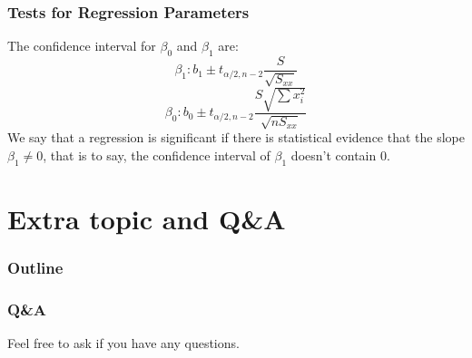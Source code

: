 \documentclass{beamer}
\begin{document}
\begin{frame}
    \frametitle{Tests for Regression Parameters}
    The confidence interval for $\beta_0$ and $\beta_1$ are:
    \[\beta_1: b_1\pm t_{\alpha/2, n-2} \frac{S}{\sqrt{S_{xx}}}\]
    \[\beta_0: b_0\pm t_{\alpha/2, n-2} \frac{S \sqrt{\sum x_i^2}}{\sqrt{n S_{xx}}}\]
    We say that a regression is significant if there is statistical evidence that
    the slope $\beta_1\neq 0$, that is to say, the confidence interval of $\beta_1$ doesn't contain 0.
    

\end{frame}

\section{Extra topic and Q\&A}
\begin{frame}
    \frametitle{Outline}
    \tableofcontents[currentsection]
\end{frame}



\begin{frame}
    \frametitle{Q\&A}
    
    Feel free to ask if you have any questions.\par
    
    
    
\end{frame}
\end{document}
